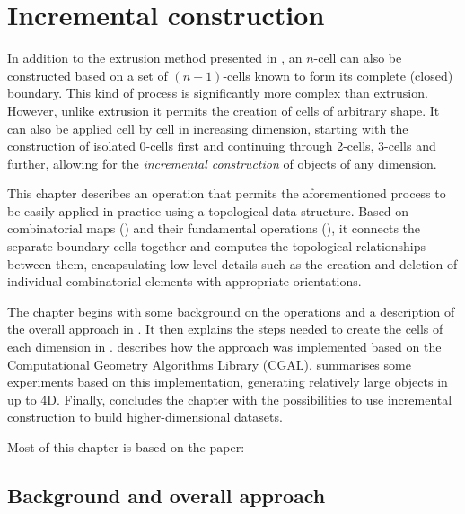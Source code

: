 
\chapter{Incremental construction}
\label{ch:incremental-construction}

In addition to the extrusion method presented in , an $n$-cell can also be constructed based on a set of $(n-1)$-cells known to form its complete (closed) boundary.
This kind of process is significantly more complex than extrusion.
However, unlike extrusion it permits the creation of cells of arbitrary shape.
It can also be applied cell by cell in increasing dimension, starting with the construction of isolated 0-cells first and continuing through 2-cells, 3-cells and further, allowing for the \emph{incremental construction} of objects of any dimension.

This chapter describes an operation that permits the aforementioned process to be easily applied in practice using a topological data structure.
Based on combinatorial maps () and their fundamental operations (), it connects the separate boundary cells together and computes the topological relationships between them, encapsulating low-level details such as the creation and deletion of individual combinatorial elements with appropriate orientations.

The chapter begins with some background on the operations and a description of the overall approach in .
It then explains the steps needed to create the cells of each dimension in .
 describes how the approach was implemented based on the Computational Geometry Algorithms Library (CGAL).
 summarises some experiments based on this implementation, generating relatively large objects in up to 4D.
Finally,  concludes the chapter with the possibilities to use incremental construction to build higher-dimensional datasets.

Most of this chapter is based on the paper:
\begin{itemize}
\papericaaincrementalconstruction%
\end{itemize}

\section{Background and overall approach}
\label{se:incremental-approach}

